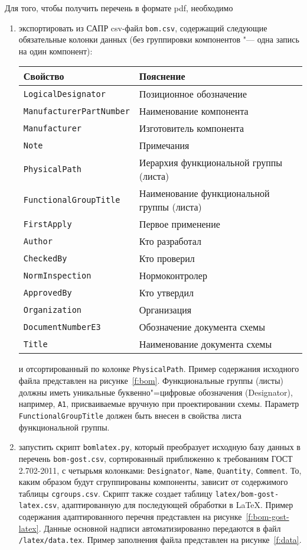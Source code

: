 Для того, чтобы получить перечень в формате pdf, необходимо
\begin{enumerate}
	\item экспортировать из САПР csv-файл \texttt{bom.csv}, содержащий следующие обязательные колонки данных (без группировки компонентов "--- одна запись на один компонент):

	\begin{table}[h]
		\centering
		\begin{tabular}{ll}
			\toprule
			Свойство & Пояснение \T \\ \midrule
			\texttt{LogicalDesignator} & Позиционное обозначение \T \\
			\texttt{ManufacturerPartNumber} & Наименование компонента \T \\
			\texttt{Manufacturer} & Изготовитель компонента \T \\
			\texttt{Note} & Примечания \T \\
			\texttt{PhysicalPath} & Иерархия функциональной группы (листа) \T \\
			\texttt{FunctionalGroupTitle} & Наименование функциональной группы (листа) \T \\
			\texttt{FirstApply} & Первое применение \T \\
			\texttt{Author} & Кто разработал \T \\
			\texttt{CheckedBy} & Кто проверил \T \\
			\texttt{NormInspection} & Нормоконтролер \T \\
			\texttt{ApprovedBy} & Кто утвердил \T \\
			\texttt{Organization} & Организация \T \\
			\texttt{DocumentNumberE3} & Обозначение документа схемы \T \\
			\texttt{Title} & Наименование документа схемы \T \\ \bottomrule
		\end{tabular}
	\end{table}
и отсортированный по колонке \texttt{PhysicalPath}. %
Пример содержания исходного файла представлен на рисунке~\ref{f:bom}. Функциональные группы (листы) должны иметь уникальные буквенно"=цифровые обозначения (Designator), например, \texttt{A1}, присваиваемые вручную при проектировании схемы. Параметр \texttt{FunctionalGroupTitle} должен быть внесен в свойства листа функциональной группы.
	\item запустить скрипт \texttt{bomlatex.py}, который преобразует исходную базу данных в перечень \texttt{bom-gost.csv}, сортированный приближенно к требованиям ГОСТ 2.702-2011, с четырьмя колонками: \texttt{Designator}, \texttt{Name}, \texttt{Quantity}, \texttt{Comment}. То, каким образом будут сгруппированы компоненты, зависит от содержимого таблицы \texttt{cgroups.csv}. Скрипт также создает таблицу \texttt{latex/bom-gost-latex.csv}, адаптированную для последующей обработки в \LaTeX. Пример содержания адаптированного перечня представлен на рисунке~\ref{f:bom-gost-latex}. Данные основной надписи автоматизированно передаются в файл \texttt{/latex/data.tex}. Пример заполнения файла представлен на рисунке~\ref{f:data}.

\end{enumerate}
